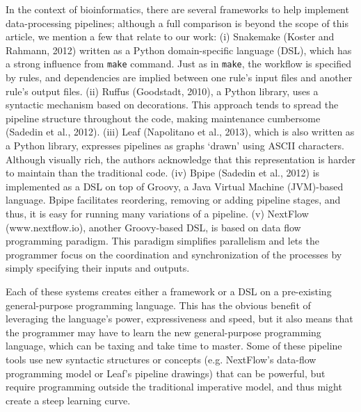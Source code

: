 In the context of bioinformatics, there are several frameworks to help implement data-processing pipelines; although a full comparison is beyond the scope of this article, we mention a few that relate to our work: (i) Snakemake (Koster and Rahmann, 2012) written as a Python domain-specific language (DSL), which has a strong influence from \texttt{make} command. Just as in \texttt{make}, the workflow is specified by rules, and dependencies are implied between one rule’s input files and another rule’s output files. (ii) Ruffus (Goodstadt, 2010), a Python library, uses a syntactic mechanism based on decorations. This approach tends to spread the pipeline structure throughout the code, making maintenance cumbersome (Sadedin et al., 2012). (iii) Leaf (Napolitano et al., 2013), which is also written as a Python library, expresses pipelines as graphs ‘drawn’ using ASCII characters. Although visually rich, the authors acknowledge that this representation is harder to maintain than the traditional code. (iv) Bpipe (Sadedin et al., 2012) is implemented as a DSL on top of Groovy, a Java Virtual Machine (JVM)-based language. Bpipe facilitates reordering, removing or adding pipeline stages, and thus, it is easy for running many variations of a pipeline. (v) NextFlow (www.nextflow.io), another Groovy-based DSL, is based on data flow programming paradigm. This paradigm simplifies parallelism and lets the programmer focus on the coordination and synchronization of the processes by simply specifying their inputs and outputs.

Each of these systems creates either a framework or a DSL on a pre-existing general-purpose programming language. This has the obvious benefit of leveraging the language’s power, expressiveness and speed, but it also means that the programmer may have to learn the new general-purpose programming language, which can be taxing and take time to master. Some of these pipeline tools use new syntactic structures or concepts (e.g. NextFlow’s data-flow programming model or Leaf’s pipeline drawings) that can be powerful, but require programming outside the traditional imperative model, and thus might create a steep learning curve.

